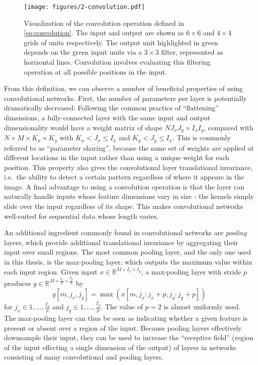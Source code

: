 \begin{figure}
  \centering
  \texttt{[image: figures/2-convolution.pdf]}
  \caption[Convolution operation]{Visualization of the convolution operation defined in \cref{eq:convolution}.
  The input and output are shown as $6 \times 6$ and $4 \times 4$ grids of units respectively.
  The output unit highlighted in green depends on the green input units via a $3 \times 3$ filter, represented as horizontal lines.
  Convolution involves evaluating this filtering operation at all possible positions in the input.}
  \label{fig:convolution}
\end{figure}

From this definition, we can observe a number of beneficial properties of using convolutional networks.
First, the number of parameters per layer is potentially dramatically decreased: Following the common practice of ``flattening'' dimensions, a fully-connected layer with the same input and output dimensionality would have a weight matrix of shape $NJ_xJ_y \times I_xI_y$, compared with $N \times M \times K_x \times K_y$ with $K_x < J_x \le I_x$ and $K_y < J_y \le I_x$.
This is commonly referred to as ``parameter sharing'', because the same set of weights are applied at different locations in the input rather than using a unique weight for each position.
This property also gives the convolutional layer translational invariance, i.e.\ the ability to detect a certain pattern regardless of where it appears in the image.
A final advantage to using a convolution operation is that the layer can naturally handle inputs whose feature dimensions vary in size - the kernels simply slide over the input regardless of its shape.
This makes convolutional networks well-suited for sequential data whose length varies.

An additional ingredient commonly found in convolutional networks are {\em pooling} layers, which provide additional translational invariance by aggregating their input over small regions.
The most common pooling layer, and the only one used in this thesis, is the max-pooling layer, which outputs the maximum value within each input region.
Given input $x \in \mathbb{R}^{M \times I_x \times I_y}$, a max-pooling layer with stride $p$ produces $y \in \mathbb{R}^{M \times \frac{I_x}{p} \times \frac{I_y}{p}}$ by
\begin{equation}
y[m, j_x, j_y] = \max(x[m, j_x:j_x + p, j_y:j_y + p])
\end{equation}
for $j_x \in 1, \ldots, \frac{I_x}{p}$ and $j_y \in 1, \ldots, \frac{I_y}{p}$.
The value of $p = 2$ is almost uniformly used.
The max-pooling layer can thus be seen as indicating whether a given feature is present or absent over a region of the input.
Because pooling layers effectively downsample their input, they can be used to increase the ``receptive field'' (region of the input effecting a single dimension of the output) of layers in networks consisting of many convolutional and pooling layers.

